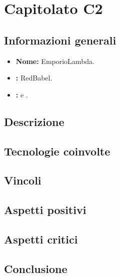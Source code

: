 \section{Capitolato C2}

\subsection{Informazioni generali}{
\begin{itemize}
\item \textbf{Nome:} EmporioLambda.
\item \textbf{\commitProg:} RedBabel.
\item \textbf{\proponProg:} \VT{} e \CR.
\end{itemize}
}

\subsection{Descrizione}{

}

\subsection{Tecnologie coinvolte}{

}

\subsection{Vincoli}{

}

\subsection{Aspetti positivi}{

}

\subsection{Aspetti critici}{

}

\subsection{Conclusione}{

}

